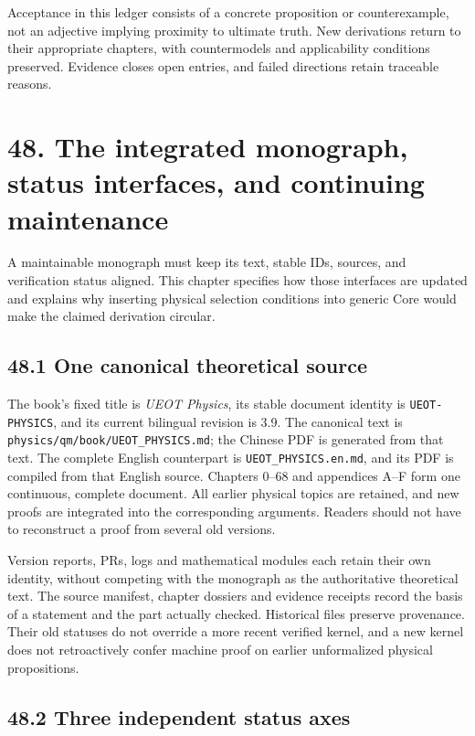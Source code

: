 \documentclass[
  11pt,
  oneside]{book}
\begin{document}
Acceptance in this ledger consists of a concrete proposition or
counterexample, not an adjective implying proximity to ultimate truth.
New derivations return to their appropriate chapters, with countermodels
and applicability conditions preserved. Evidence closes open entries,
and failed directions retain traceable reasons.

\chapter{48. The integrated monograph, status interfaces, and continuing
maintenance}\label{ch-48}

A maintainable monograph must keep its text, stable IDs, sources, and
verification status aligned. This chapter specifies how those interfaces
are updated and explains why inserting physical selection conditions
into generic Core would make the claimed derivation circular.

\section{48.1 One canonical theoretical source}

The book's fixed title is \emph{UEOT Physics}, its stable document
identity is \texttt{UEOT-\allowbreak PHYSICS}, and its current bilingual revision is
3.9. The canonical text is \texttt{physics/\allowbreak qm/\allowbreak book/\allowbreak UEOT\_\allowbreak PHYSICS.\allowbreak md};
the Chinese PDF is generated from that text. The complete English
counterpart is \texttt{UEOT\_\allowbreak PHYSICS.\allowbreak en.\allowbreak md}, and its PDF is compiled
from that English source. Chapters 0--68 and appendices A--F form one
continuous, complete document. All earlier physical topics are retained,
and new proofs are integrated into the corresponding arguments. Readers
should not have to reconstruct a proof from several old versions.

Version reports, PRs, logs and mathematical modules each retain their
own identity, without competing with the monograph as the authoritative
theoretical text. The source manifest, chapter dossiers and evidence
receipts record the basis of a statement and the part actually checked.
Historical files preserve provenance. Their old statuses do not override
a more recent verified kernel, and a new kernel does not retroactively
confer machine proof on earlier unformalized physical propositions.

\section{48.2 Three independent status axes}
\end{document}
